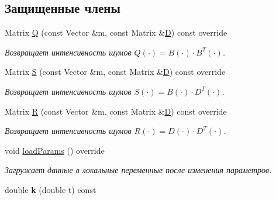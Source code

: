 \subsection*{Защищенные члены}
\begin{DoxyCompactItemize}
\item 
Matrix \hyperlink{class_tasks_1_1_continuous_1_1_landing_linear_a95641c126ba2e99da83cd6f3683b6238}{Q} (const Vector \&m, const Matrix \&\hyperlink{class_tasks_1_1_continuous_1_1_landing_linear_a829c4b67c6a4cd8bb1a430e4e55d9d45}{D}) const override\hypertarget{class_tasks_1_1_continuous_1_1_landing_linear_a95641c126ba2e99da83cd6f3683b6238}{}\label{class_tasks_1_1_continuous_1_1_landing_linear_a95641c126ba2e99da83cd6f3683b6238}

\begin{DoxyCompactList}\small\item\em Возвращает интенсивность шумов $Q(\cdot) = B(\cdot) \cdot B^T(\cdot)$. \end{DoxyCompactList}\item 
Matrix \hyperlink{class_tasks_1_1_continuous_1_1_landing_linear_a886bc6dd08e4355ab0c491d48f9de002}{S} (const Vector \&m, const Matrix \&\hyperlink{class_tasks_1_1_continuous_1_1_landing_linear_a829c4b67c6a4cd8bb1a430e4e55d9d45}{D}) const override
\begin{DoxyCompactList}\small\item\em Возвращает интенсивность шумов $S(\cdot) = B(\cdot) \cdot D^T(\cdot)$. \end{DoxyCompactList}\item 
Matrix \hyperlink{class_tasks_1_1_continuous_1_1_landing_linear_a1eaa8243f547b6cbd3b29ec625f887a8}{R} (const Vector \&m, const Matrix \&\hyperlink{class_tasks_1_1_continuous_1_1_landing_linear_a829c4b67c6a4cd8bb1a430e4e55d9d45}{D}) const override\hypertarget{class_tasks_1_1_continuous_1_1_landing_linear_a1eaa8243f547b6cbd3b29ec625f887a8}{}\label{class_tasks_1_1_continuous_1_1_landing_linear_a1eaa8243f547b6cbd3b29ec625f887a8}

\begin{DoxyCompactList}\small\item\em Возвращает интенсивность шумов $R(\cdot) = D(\cdot) \cdot D^T(\cdot)$. \end{DoxyCompactList}\item 
void \hyperlink{class_tasks_1_1_continuous_1_1_landing_linear_ac860d39de1972d7484ac665d174b0b94}{load\+Params} () override\hypertarget{class_tasks_1_1_continuous_1_1_landing_linear_ac860d39de1972d7484ac665d174b0b94}{}\label{class_tasks_1_1_continuous_1_1_landing_linear_ac860d39de1972d7484ac665d174b0b94}

\begin{DoxyCompactList}\small\item\em Загружает данные в локальные переменные после изменения параметров. \end{DoxyCompactList}\item 
double {\bfseries k} (double t) const \hypertarget{class_tasks_1_1_continuous_1_1_landing_linear_ac1ca1187944b2a44adbf486cc7c72d4c}{}\label{class_tasks_1_1_continuous_1_1_landing_linear_ac1ca1187944b2a44adbf486cc7c72d4c}

\end{DoxyCompactItemize}
